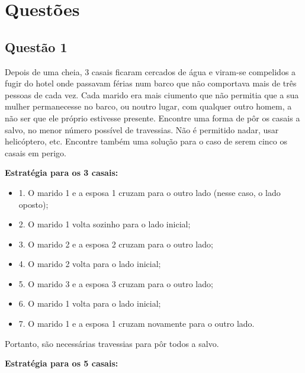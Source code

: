 



\chapter{Questões}

\section*{Questão 1}

Depois de uma cheia, 3 casais ficaram cercados de água e viram-se compelidos a fugir do hotel onde passavam férias num barco que não comportava mais de três pessoas de cada vez. Cada marido era mais ciumento que não permitia que a sua mulher permanecesse no barco, ou noutro lugar, com qualquer outro homem, a não ser que ele próprio estivesse presente. Encontre uma forma de pôr os casais a salvo, no menor número possível de travessias. Não é permitido nadar, usar helicóptero, etc. Encontre também uma solução para o caso de serem cinco os casais em perigo.

\vspace{10pt}
\textbf{Estratégia para os 3 casais:}

\begin{itemize}
    \item 1. O marido 1 e a esposa 1 cruzam para o outro lado (nesse caso, o lado oposto);
    \item 2. O marido 1 volta sozinho para o lado inicial;
    \item 3. O marido 2 e a esposa 2 cruzam para o outro lado;
    \item 4. O marido 2 volta para o lado inicial;
    \item 5. O marido 3 e a esposa 3 cruzam para o outro lado;
    \item 6. O marido 1 volta para o lado inicial;
    \item 7. O marido 1 e a esposa 1 cruzam novamente para o outro lado.
\end{itemize}

Portanto, são necessárias  travessias para pôr todos a salvo.

\vspace{15pt}

\textbf{Estratégia para os 5 casais:}

